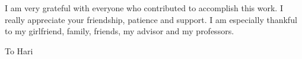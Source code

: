 \documentclass[tesis,reqno]{unaltesis2}
\begin{document}
\begin{Reconocimientos}

I am very grateful with everyone who contributed to accomplish this work. I really appreciate your friendship, patience and support.
I am especially thankful to my girlfriend, family, friends, my advisor and my professors.
\\

\end{Reconocimientos}

\begin{Dedicatoria}
To Hari
\end{Dedicatoria}


\tableofcontents

\listoffigures

\listoftables



\CuerpoDeLaTesis

 


 

 
 
\end{document}
